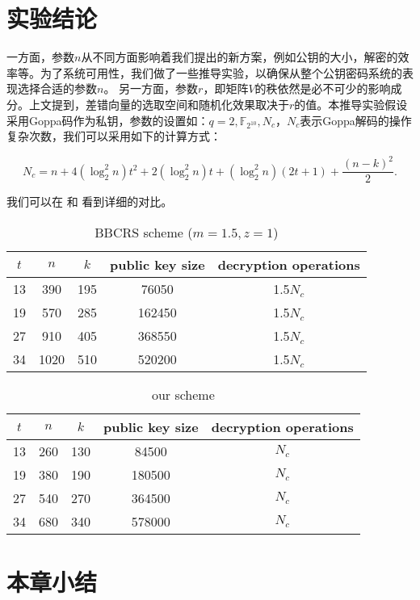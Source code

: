 \section{实验结论}
一方面，参数$n$从不同方面影响着我们提出的新方案，例如公钥的大小，解密的效率等。为了系统可用性，我们做了一些推导实验，以确保从整个公钥密码系统的表现选择合适的参数$n$。 另一方面，参数$r$，即矩阵$V$的秩依然是必不可少的影响成分。上文提到，差错向量的选取空间和随机化效果取决于$r$的值。本推导实验假设采用Goppa码作为私钥，参数的设置如：$q = 2, \mathbb{F}_{2^{10}}, N_c$，$N_c$表示Goppa解码的操作复杂次数，我们可以采用如下的计算方式：

\begin{equation}
	N_c=n+4(\log_2^2n)t^2+2(\log_2^2n)t+(\log_2^2n)(2t+1)+\frac{(n-k)^2}{2}.
\end{equation}

我们可以在 和 看到详细的对比。

\begin{table}[h]
	\begin{center}
		\caption{BBCRS scheme ($m=1.5,z=1$)}\label{bbcrsScheme}
		\begin{tabular}{ccccc}
			\hline
			$t$ & $n$& $k$ & public key size& decryption operations\\
			\hline
			13& 390& 195& 76050& 1.5$N_c$\\
			19& 570& 285& 162450& 1.5$N_c$\\
			27& 910& 405& 368550& 1.5$N_c$\\
			34& 1020& 510& 520200& 1.5$N_c$\\
			\hline
		\end{tabular}
		\label{tab1}
	\end{center}
\end{table}

\begin{table}[h]
	\begin{center}
		\caption{our scheme}\label{ourScheme}
		\begin{tabular}{ccccc}
			\hline
			$t$ & $n$& $k$ & public key size& decryption operations\\
			\hline
			13& 260& 130& 84500& $N_c$\\
			19& 380& 190& 180500& $N_c$\\
			27& 540& 270& 364500& $N_c$\\
			34& 680& 340& 578000& $N_c$\\
			\hline
		\end{tabular}
		\label{tab2}
	\end{center}
\end{table}


\section{本章小结}
